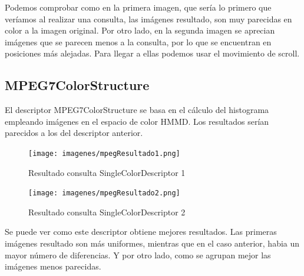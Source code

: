 Podemos comprobar como en la primera imagen, que sería lo primero que veríamos al realizar una consulta, las imágenes resultado, son muy parecidas en color a la imagen original. Por otro lado, en la segunda imagen se aprecian imágenes que se parecen menos a la consulta, por lo que se encuentran en posiciones más alejadas. Para llegar a ellas podemos usar el movimiento de scroll.


\subsection{MPEG7ColorStructure}

El descriptor MPEG7ColorStructure se basa en el cálculo del histograma empleando imágenes en el espacio de color HMMD. Los resultados serían parecidos a los del descriptor anterior.

\begin{figure}[H] %
\centering
\texttt{[image: imagenes/mpegResultado1.png]}  %
\label{mpegResultado1.png}
\caption{Resultado consulta SingleColorDescriptor 1 }
\end{figure}

\begin{figure}[H] %
\centering
\texttt{[image: imagenes/mpegResultado2.png]}  %
\label{mpegResultado1.png}
\caption{Resultado consulta SingleColorDescriptor 2 }
\end{figure}

Se puede ver como este descriptor obtiene mejores resultados. Las primeras imágenes resultado son más uniformes, mientras que en el caso anterior, habia un mayor número de diferencias. Y por otro lado, como se agrupan mejor las imágenes menos parecidas.





